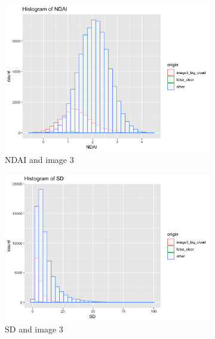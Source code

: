 \documentclass[jou]{apa}%
\begin{document}
\begin{figure}[H]
\hspace*{-.5cm}\begin{subfigure}{0.4\columnwidth}
    \includegraphics[scale=.2]{NDAIfalseclear}
    \caption{NDAI and image 3}
    \label{fig:1}
  \end{subfigure}\hfill %
\begin{subfigure}{0.4\columnwidth} \hspace*{-1cm}
    \includegraphics[scale=.2]{SDfalseclear}
    \caption{SD and image 3}
    \label{fig:2}
  \end{subfigure}
\hspace*{-.5cm}\begin{subfigure}{0.4\columnwidth}

\end{subfigure}
\end{figure}
\end{document}
